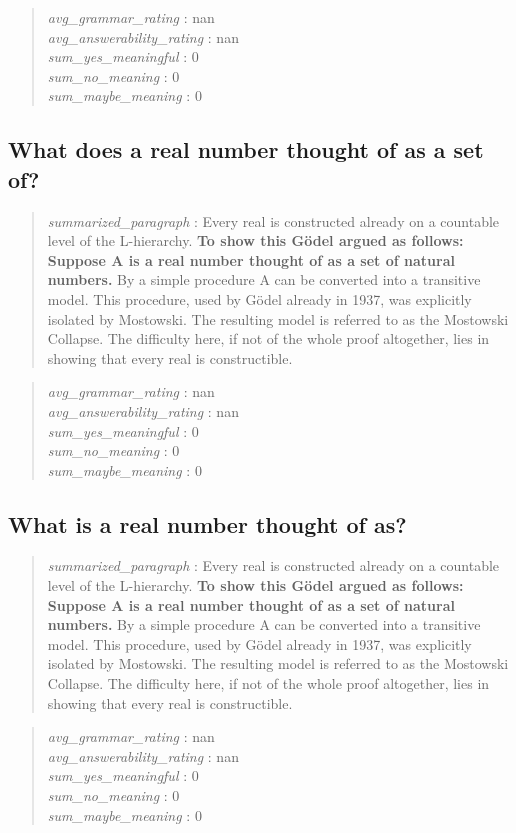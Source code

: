 \begin{quote}
\emph{avg\_grammar\_rating} : nan\\
\emph{avg\_answerability\_rating} : nan\\
\emph{sum\_yes\_meaningful} : 0\\
\emph{sum\_no\_meaning} : 0\\
\emph{sum\_maybe\_meaning} : 0
\end{quote}

\hypertarget{what-does-a-real-number-thought-of-as-a-set-of}{%
\subsection{What does a real number thought of as a set
of?}\label{what-does-a-real-number-thought-of-as-a-set-of}}

\begin{quote}
\emph{summarized\_paragraph} : Every real is constructed already on a
countable level of the L-hierarchy. \textbf{To show this Gödel argued as
follows: Suppose A is a real number thought of as a set of natural
numbers.} By a simple procedure A can be converted into a transitive
model. This procedure, used by Gödel already in 1937, was explicitly
isolated by Mostowski. The resulting model is referred to as the
Mostowski Collapse. The difficulty here, if not of the whole proof
altogether, lies in showing that every real is constructible.
\end{quote}

\begin{quote}
\emph{avg\_grammar\_rating} : nan\\
\emph{avg\_answerability\_rating} : nan\\
\emph{sum\_yes\_meaningful} : 0\\
\emph{sum\_no\_meaning} : 0\\
\emph{sum\_maybe\_meaning} : 0
\end{quote}

\hypertarget{what-is-a-real-number-thought-of-as}{%
\subsection{What is a real number thought of
as?}\label{what-is-a-real-number-thought-of-as}}

\begin{quote}
\emph{summarized\_paragraph} : Every real is constructed already on a
countable level of the L-hierarchy. \textbf{To show this Gödel argued as
follows: Suppose A is a real number thought of as a set of natural
numbers.} By a simple procedure A can be converted into a transitive
model. This procedure, used by Gödel already in 1937, was explicitly
isolated by Mostowski. The resulting model is referred to as the
Mostowski Collapse. The difficulty here, if not of the whole proof
altogether, lies in showing that every real is constructible.
\end{quote}

\begin{quote}
\emph{avg\_grammar\_rating} : nan\\
\emph{avg\_answerability\_rating} : nan\\
\emph{sum\_yes\_meaningful} : 0\\
\emph{sum\_no\_meaning} : 0\\
\emph{sum\_maybe\_meaning} : 0
\end{quote}
